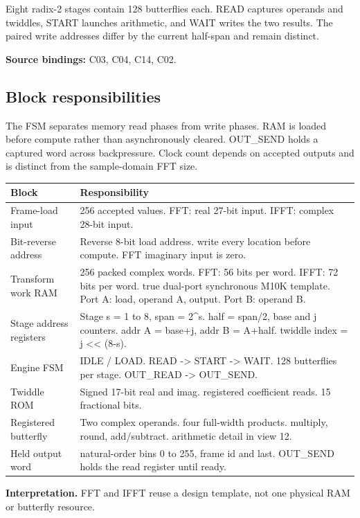 \documentclass[11pt,letterpaper]{article}
\begin{document}
Eight radix-2 stages contain 128 butterflies each. READ captures operands and twiddles, START launches arithmetic, and WAIT writes the two results. The paired write addresses differ by the current half-span and remain distinct.

\noindent\textbf{Source bindings:} C03, C04, C14, C02.
\clearpage
\subsection*{Block responsibilities}
The FSM separates memory read phases from write phases. RAM is loaded before compute rather than asynchronously cleared. OUT\_SEND holds a captured word across backpressure. Clock count depends on accepted outputs and is distinct from the sample-domain FFT size.
\par\medskip\noindent
\begin{tabularx}{\linewidth}{@{}>{\raggedright\arraybackslash}p{1.65in}Y@{}}\toprule
\textbf{Block} & \textbf{Responsibility} \\ \midrule
Frame-load input & 256 accepted values. FFT: real 27-bit input. IFFT: complex 28-bit input. \\[5pt]
Bit-reverse address & Reverse 8-bit load address. write every location before compute. FFT imaginary input is zero. \\[5pt]
Transform work RAM & 256 packed complex words. FFT: 56 bits per word. IFFT: 72 bits per word. true dual-port synchronous M10K template. Port A: load, operand A, output. Port B: operand B. \\[5pt]
Stage address registers & Stage s = 1 to 8, span = 2\textasciicircum{}s. half = span/2, base and j counters. addr A = base+j, addr B = A+half. twiddle index = j << (8-s). \\[5pt]
Engine FSM & IDLE / LOAD. READ -> START -> WAIT. 128 butterflies per stage. OUT\_READ -> OUT\_SEND. \\[5pt]
Twiddle ROM & Signed 17-bit real and imag. registered coefficient reads. 15 fractional bits. \\[5pt]
Registered butterfly & Two complex operands. four full-width products. multiply, round, add/subtract. arithmetic detail in view 12. \\[5pt]
Held output word & natural-order bins 0 to 255, frame id and last. OUT\_SEND holds the read register until ready. \\[5pt]
\bottomrule\end{tabularx}
\vspace{8pt}
\noindent\textbf{Interpretation.} FFT and IFFT reuse a design template, not one physical RAM or butterfly resource.
\clearpage
\end{document}
